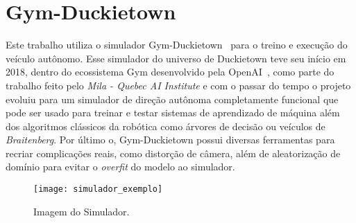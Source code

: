 \section{Gym-Duckietown}

Este trabalho utiliza o simulador Gym-Duckietown~\citep{gym-duckietown} para o treino e execução do veículo autônomo. Esse simulador do universo de Duckietown teve seu início em 2018, dentro do ecossistema Gym desenvolvido pela OpenAI~\citep{1606.01540}, como parte do trabalho feito pelo \textit{Mila - Quebec AI Institute} e com o passar do tempo o projeto evoluiu para um simulador de direção autônoma completamente funcional que pode ser usado para treinar e testar sistemas de aprendizado de máquina além dos algoritmos clássicos da robótica como árvores de decisão ou veículos de \textit{Braitenberg}. Por último o, Gym-Duckietown possui diversas ferramentas para recriar complicações reais, como distorção de câmera, além de aleatorização de domínio para evitar o \textit{overfit} do modelo ao simulador.

\begin{figure}
	\centering
	\texttt{[image: simulador\_exemplo]}
	\caption{Imagem do Simulador.\label{fig:simulador_exemplo}}
\end{figure}


